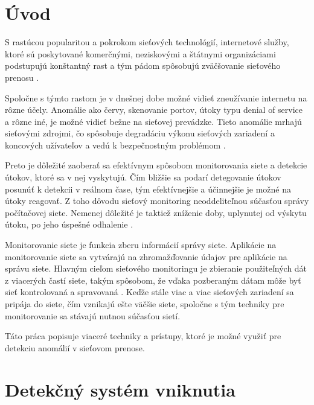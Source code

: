 \chapter{Úvod}
\label{Sec1}

S rastúcou popularitou a pokrokom sieťových technológií, internetové služby, ktoré sú poskytované komerčnými, neziskovými a štátnymi organizáciami podstupujú konštantný rast a tým pádom spôsobujú zväčšovanie sieťového prenosu \cite{anomaly-book}.

Spoločne s týmto rastom je v dnešnej dobe možné vidieť zneužívanie internetu na rôzne účely. Anomálie ako červy, skenovanie portov, útoky typu denial of service a rôzne iné, je možné vidieť bežne na sieťovej prevádzke. Tieto anomálie mrhajú sieťovými zdrojmi, čo spôsobuje degradáciu výkonu sieťových zariadení a koncových užívateľov a vedú k bezpečnostným problémom \cite{Gu-McCallum-Detecting}.

Preto je dôležité zaoberať sa efektívnym spôsobom monitorovania siete a detekcie útokov, ktoré sa v nej vyskytujú. Čím bližšie sa podarí detegovanie útokov posunúť k detekcii v reálnom čase, tým efektívnejšie a účinnejšie je možné na útoky reagovať. Z toho dôvodu sieťový monitoring neoddeliteľnou súčasťou správy počítačovej siete. Nemenej dôležité je taktiež zníženie doby, uplynutej od výskytu útoku, po jeho úspešné odhalenie \cite{Pavuk:2017:MuniBP}.

Monitorovanie siete je funkcia zberu informácií správy siete. Aplikácie na monitorovanie siete sa vytvárajú na zhromažďovanie údajov pre aplikácie na správu siete. Hlavným cieľom sieťového monitoringu je zbieranie použiteľných dát z viacerých častí siete, takým spôsobom, že vďaka pozberaným dátam môže byť sieť kontrolovaná a spravovaná \cite{PDF-Monitoring}. Keďže stále viac a viac sieťových zariadení sa pripája do siete, čím vznikajú ešte väčšie siete, spoločne s tým techniky pre monitorovanie sa stávajú nutnou súčasťou sietí.

Táto práca popisuje viaceré techniky a prístupy, ktoré je možné využiť pre detekciu anomálií v sieťovom prenose.

\chapter{Detekčný systém vniknutia}

